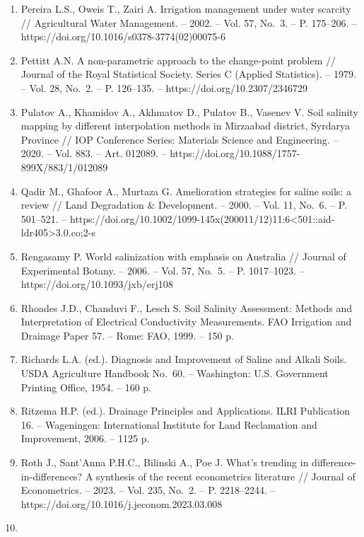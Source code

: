 \documentclass[14pt,a4paper,oneside]{extreport}
\begin{document}
\begin{enumerate}
  variations in the Amu Darya Delta // Water. -- 2020. -- Vol. 12,
  No.~10. -- Art. 2869. -- https://doi.org/10.3390/w12102869
\item
  Pereira L.S., Oweis T., Zairi A. Irrigation management under water
  scarcity // Agricultural Water Management. -- 2002. -- Vol. 57, No.~3.
  -- P. 175--206. -- https://doi.org/10.1016/s0378-3774(02)00075-6
\item
  Pettitt A.N. A non-parametric approach to the change-point problem //
  Journal of the Royal Statistical Society. Series C (Applied
  Statistics). -- 1979. -- Vol. 28, No.~2. -- P. 126--135. --
  https://doi.org/10.2307/2346729
\item
  Pulatov A., Khamidov A., Akhmatov D., Pulatov B., Vasenev V. Soil
  salinity mapping by different interpolation methods in Mirzaabad
  district, Syrdarya Province // IOP Conference Series: Materials
  Science and Engineering. -- 2020. -- Vol. 883. -- Art. 012089. --
  https://doi.org/10.1088/1757-899X/883/1/012089
\item
  Qadir M., Ghafoor A., Murtaza G. Amelioration strategies for saline
  soils: a review // Land Degradation \& Development. -- 2000. -- Vol.
  11, No.~6. -- P. 501--521. --
  https://doi.org/10.1002/1099-145x(200011/12)11:6\textless501::aid-ldr405\textgreater3.0.co;2-s
\item
  Rengasamy P. World salinization with emphasis on Australia // Journal
  of Experimental Botany. -- 2006. -- Vol. 57, No.~5. -- P. 1017--1023.
  -- https://doi.org/10.1093/jxb/erj108
\item
  Rhoades J.D., Chanduvi F., Lesch S. Soil Salinity Assessment: Methods
  and Interpretation of Electrical Conductivity Measurements. FAO
  Irrigation and Drainage Paper 57. -- Rome: FAO, 1999. -- 150 p.
\item
  Richards L.A. (ed.). Diagnosis and Improvement of Saline and Alkali
  Soils. USDA Agriculture Handbook No.~60. -- Washington: U.S.
  Government Printing Office, 1954. -- 160 p.
\item
  Ritzema H.P. (ed.). Drainage Principles and Applications. ILRI
  Publication 16. -- Wageningen: International Institute for Land
  Reclamation and Improvement, 2006. -- 1125 p.
\item
  Roth J., Sant'Anna P.H.C., Bilinski A., Poe J. What's trending in
  difference-in-differences? A synthesis of the recent econometrics
  literature // Journal of Econometrics. -- 2023. -- Vol. 235, No.~2. --
  P. 2218--2244. -- https://doi.org/10.1016/j.jeconom.2023.03.008
\item

\end{enumerate}
\end{document}
